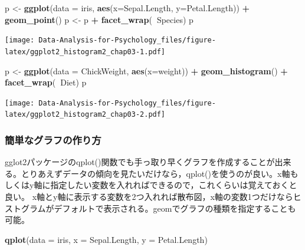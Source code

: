 \documentclass[]{article}
\newenvironment{Shaded}{\begin{snugshade}}{\end{snugshade}}
\newcommand{\KeywordTok}[1]{\textcolor[rgb]{0.13,0.29,0.53}{\textbf{#1}}}
\newcommand{\DataTypeTok}[1]{\textcolor[rgb]{0.13,0.29,0.53}{#1}}
\newcommand{\StringTok}[1]{\textcolor[rgb]{0.31,0.60,0.02}{#1}}
\newcommand{\OperatorTok}[1]{\textcolor[rgb]{0.81,0.36,0.00}{\textbf{#1}}}
\newcommand{\NormalTok}[1]{#1}
\begin{document}
\begin{Shaded}
\begin{Highlighting}[]
\NormalTok{p <-}\StringTok{ }\KeywordTok{ggplot}\NormalTok{(}\DataTypeTok{data =}\NormalTok{ iris, }\KeywordTok{aes}\NormalTok{(}\DataTypeTok{x=}\NormalTok{Sepal.Length, }\DataTypeTok{y=}\NormalTok{Petal.Length)) }\OperatorTok{+}\StringTok{ }
\StringTok{      }\KeywordTok{geom_point}\NormalTok{()}
\NormalTok{p <-}\StringTok{ }\NormalTok{p }\OperatorTok{+}\StringTok{ }\KeywordTok{facet_wrap}\NormalTok{(}\OperatorTok{~}\NormalTok{Species) }
\NormalTok{p}
\end{Highlighting}
\end{Shaded}

\texttt{[image: Data-Analysis-for-Psychology\_files/figure-latex/ggplot2\_histogram2\_chap03-1.pdf]}

\begin{Shaded}
\begin{Highlighting}[]
\NormalTok{p <-}\StringTok{ }\KeywordTok{ggplot}\NormalTok{(}\DataTypeTok{data =}\NormalTok{ ChickWeight, }\KeywordTok{aes}\NormalTok{(}\DataTypeTok{x=}\NormalTok{weight)) }\OperatorTok{+}\StringTok{ }
\StringTok{    }\KeywordTok{geom_histogram}\NormalTok{() }\OperatorTok{+}\StringTok{ }\KeywordTok{facet_wrap}\NormalTok{(}\OperatorTok{~}\NormalTok{Diet)}
\NormalTok{p}
\end{Highlighting}
\end{Shaded}

\texttt{[image: Data-Analysis-for-Psychology\_files/figure-latex/ggplot2\_histogram2\_chap03-2.pdf]}

\subsubsection{簡単なグラフの作り方}

gglot2パッケージのqplot()関数でも手っ取り早くグラフを作成することが出来る。とりあえずデータの傾向を見たいだけなら，qplot()を使うのが良い。x軸もしくはy軸に指定したい変数を入れればできるので，これくらいは覚えておくと良い。
x軸とy軸に表示する変数を2つ入れれば散布図，x軸の変数1つだけならヒストグラムがデフォルトで表示される。geomでグラフの種類を指定することも可能。

\begin{Shaded}
\begin{Highlighting}[]
\KeywordTok{qplot}\NormalTok{(}\DataTypeTok{data =}\NormalTok{ iris, }\DataTypeTok{x =}\NormalTok{ Sepal.Length, }\DataTypeTok{y =}\NormalTok{ Petal.Length)}
\end{Highlighting}
\end{Shaded}
\end{document}
